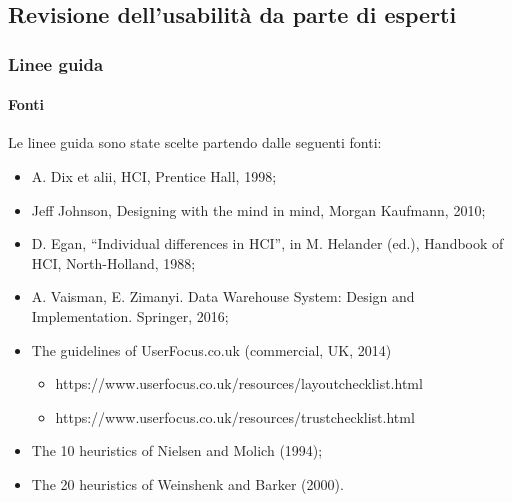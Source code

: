 \subsection{Revisione dell'usabilità da parte di esperti}

\subsubsection{Linee guida}

\paragraph{Fonti}
Le linee guida sono state scelte partendo dalle seguenti fonti:
\begin{itemize}
    \item A. Dix et alii, HCI, Prentice Hall, 1998;
    \item Jeff Johnson, Designing with the mind in mind, Morgan Kaufmann, 2010;
    \item D. Egan, “Individual differences in HCI”, in M. Helander (ed.), Handbook of HCI, North-Holland, 1988;
    \item A. Vaisman, E. Zimanyi. Data Warehouse System: Design and Implementation. Springer, 2016;
    \item The guidelines of UserFocus.co.uk (commercial, UK, 2014)
    \begin{itemize}
        \item https://www.userfocus.co.uk/resources/layoutchecklist.html
        \item https://www.userfocus.co.uk/resources/trustchecklist.html
    \end{itemize}
    \item The 10 heuristics of Nielsen and Molich (1994);
    \item The 20 heuristics of Weinshenk and Barker (2000).
\end{itemize}

